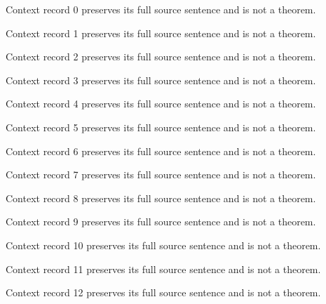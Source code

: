 \documentclass{article}
\begin{document}
\begin{remark}\label{train:context:0}Context record 0 preserves its full source sentence and is not a theorem.\end{remark}
\begin{remark}\label{train:context:1}Context record 1 preserves its full source sentence and is not a theorem.\end{remark}
\begin{remark}\label{train:context:2}Context record 2 preserves its full source sentence and is not a theorem.\end{remark}
\begin{remark}\label{train:context:3}Context record 3 preserves its full source sentence and is not a theorem.\end{remark}
\begin{remark}\label{train:context:4}Context record 4 preserves its full source sentence and is not a theorem.\end{remark}
\begin{remark}\label{train:context:5}Context record 5 preserves its full source sentence and is not a theorem.\end{remark}
\begin{remark}\label{train:context:6}Context record 6 preserves its full source sentence and is not a theorem.\end{remark}
\begin{remark}\label{train:context:7}Context record 7 preserves its full source sentence and is not a theorem.\end{remark}
\begin{remark}\label{train:context:8}Context record 8 preserves its full source sentence and is not a theorem.\end{remark}
\begin{remark}\label{train:context:9}Context record 9 preserves its full source sentence and is not a theorem.\end{remark}
\begin{remark}\label{train:context:10}Context record 10 preserves its full source sentence and is not a theorem.\end{remark}
\begin{remark}\label{train:context:11}Context record 11 preserves its full source sentence and is not a theorem.\end{remark}
\begin{remark}\label{train:context:12}Context record 12 preserves its full source sentence and is not a theorem.\end{remark}
\end{document}
